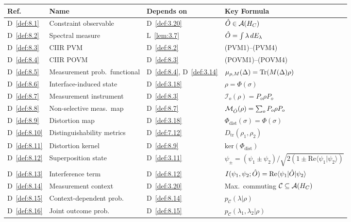 \begin{center}
\begin{tabular}{llll}
\hline
\textbf{Ref.} & \textbf{Name} & \textbf{Depends on} & \textbf{Key Formula} \\
\hline
D~\ref{def:8.1} & Constraint observable &
  D~\ref{def:3.20} &
  $\hat{O} \in \mathcal{A}(H_C)$ \\
D~\ref{def:8.2} & Spectral measure &
  L~\ref{lem:3.7} &
  $\hat{O} = \int \lambda\,dE_\lambda$ \\
D~\ref{def:8.3} & CIIR PVM &
  D~\ref{def:8.2} &
  (PVM1)--(PVM4) \\
D~\ref{def:8.4} & CIIR POVM &
  D~\ref{def:8.3} &
  (POVM1)--(POVM4) \\
D~\ref{def:8.5} & Measurement prob.\ functional &
  D~\ref{def:8.4}, D~\ref{def:3.14} &
  $\mu_{\rho,M}(\Delta) = \mathrm{Tr}(M(\Delta)\rho)$ \\
D~\ref{def:8.6} & Interface-induced state &
  D~\ref{def:3.18} &
  $\rho = \Phi(\sigma)$ \\
D~\ref{def:8.7} & Measurement instrument &
  D~\ref{def:8.3} &
  $\mathcal{I}_o(\rho) = P_o\rho P_o$ \\
D~\ref{def:8.8} & Non-selective meas.\ map &
  D~\ref{def:8.7} &
  $\mathcal{M}_{\hat{O}}(\rho) = \sum_o P_o\rho P_o$ \\
D~\ref{def:8.9} & Distortion map &
  D~\ref{def:3.18} &
  $\Phi_{\mathrm{dist}}(\sigma) = \Phi(\sigma)$ \\
D~\ref{def:8.10} & Distinguishability metrics &
  D~\ref{def:7.12} &
  $D_{\mathrm{tr}}(\rho_1,\rho_2)$ \\
D~\ref{def:8.11} & Distortion kernel &
  D~\ref{def:8.9} &
  $\mathrm{ker}(\Phi_{\mathrm{dist}})$ \\
D~\ref{def:8.12} & Superposition state &
  D~\ref{def:3.11} &
  $\psi_\pm = (\psi_1 \pm \psi_2)/\sqrt{2(1 \pm \mathrm{Re}\langle\psi_1|\psi_2\rangle)}$ \\
D~\ref{def:8.13} & Interference term &
  D~\ref{def:8.12} &
  $I(\psi_1,\psi_2;\hat{O}) = \mathrm{Re}\langle\psi_1|\hat{O}|\psi_2\rangle$ \\
D~\ref{def:8.14} & Measurement context &
  D~\ref{def:3.20} &
  Max.\ commuting $\mathcal{C} \subseteq \mathcal{A}(H_C)$ \\
D~\ref{def:8.15} & Context-dependent prob. &
  D~\ref{def:8.14} &
  $p_\mathcal{C}(\lambda|\rho)$ \\
D~\ref{def:8.16} & Joint outcome prob. &
  D~\ref{def:8.15} &
  $p_\mathcal{C}(\lambda_1,\lambda_2|\rho)$ \\

\end{tabular}
\end{center}
